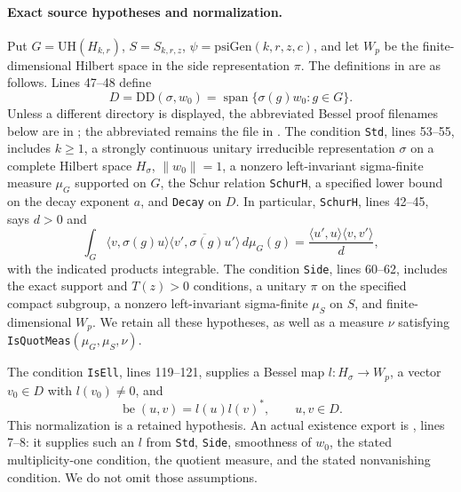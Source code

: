 \documentclass[11pt,a4paper]{article}
\begin{document}
\paragraph{Exact source hypotheses and normalization.}
Put \(G=\mathrm{UH}(H_{k,r})\), \(S=S_{k,r,z}\),
\(\psi=\mathrm{psiGen}(k,r,z,c)\), and let \(W_p\) be the finite-dimensional
Hilbert space in the side representation \(\pi\).
The definitions in
are as follows. Lines 47--48 define
\[
 D=\mathrm{DD}(\sigma,w_0)
 =\operatorname{span}\{\sigma(g)w_0:g\in G\}.
\]
Unless a different directory is displayed, the abbreviated Bessel
proof filenames below are in
;
the abbreviated  remains the file in
.
The condition \texttt{Std}, lines 53--55, includes \(k\ge1\), a
strongly continuous unitary irreducible representation \(\sigma\)
on a complete Hilbert space \(H_\sigma\), \(\|w_0\|=1\), a nonzero
left-invariant sigma-finite measure \(\mu_G\) supported on \(G\),
the Schur relation \texttt{SchurH}, a specified lower bound on
the decay exponent \(a\), and \texttt{Decay} on \(D\).
In particular, \texttt{SchurH}, lines 42--45, says \(d>0\) and
\[
 \int_G
 \langle v,\sigma(g)u\rangle
 \overline{\langle v',\sigma(g)u'\rangle}\,d\mu_G(g)
 =\frac{\langle u',u\rangle\langle v,v'\rangle}{d},
\]
with the indicated products integrable.
The condition \texttt{Side}, lines 60--62, includes the exact
support and \(T(z)>0\) conditions, a unitary \(\pi\) on the
specified compact subgroup, a nonzero left-invariant sigma-finite
\(\mu_S\) on \(S\), and finite-dimensional \(W_p\).
We retain all these hypotheses, as well as a measure \(\nu\)
satisfying \texttt{IsQuotMeas}\((\mu_G,\mu_S,\nu)\).

The condition \texttt{IsEll}, lines 119--121, supplies a Bessel map
\(l:H_\sigma\to W_p\), a vector \(v_0\in D\) with \(l(v_0)\ne0\),
and
\[
 \operatorname{be}(u,v)=l(u)l(v)^*,\qquad u,v\in D.
\]
This normalization is a retained hypothesis. An actual existence
export is
,
lines 7--8: it supplies such an \(l\) from \texttt{Std},
\texttt{Side}, smoothness of \(w_0\), the stated multiplicity-one
condition, the quotient measure, and the stated nonvanishing
condition. We do not omit those assumptions.
\end{document}
